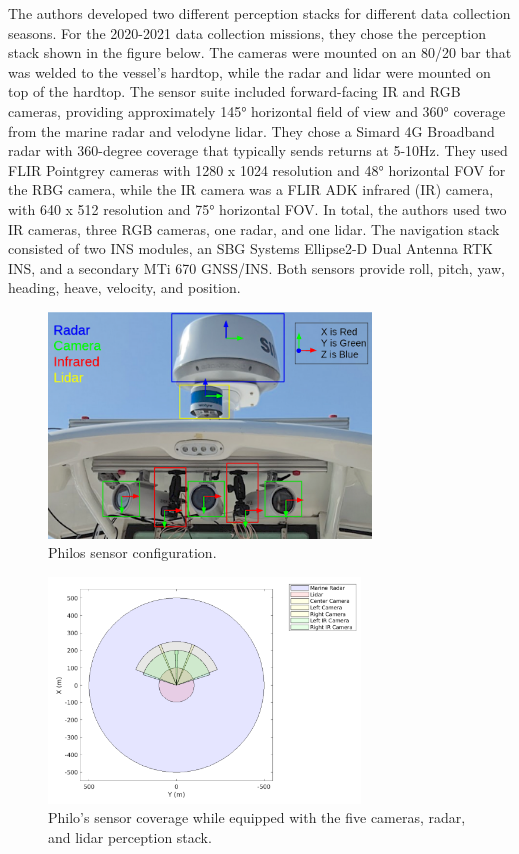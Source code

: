 The authors developed two different perception stacks for different data collection seasons. For the 2020-2021 data collection missions, they chose the perception stack shown in the figure below. The cameras were mounted on an 80/20 bar that was welded to the vessel's hardtop, while the radar and lidar were mounted on top of the hardtop. The sensor suite included forward-facing IR and RGB cameras, providing approximately 145° horizontal field of view and 360° coverage from the marine radar and velodyne lidar. They chose a Simard 4G Broadband radar with 360-degree coverage that typically sends returns at 5-10Hz. They used FLIR Pointgrey cameras with 1280 x 1024 resolution and 48° horizontal FOV for the RBG camera, while the IR camera was a FLIR ADK infrared (IR) camera, with 640 x 512 resolution and 75° horizontal FOV. In total, the authors used two IR cameras, three RGB cameras, one radar, and one lidar. The navigation stack consisted of two INS modules, an SBG Systems Ellipse2-D Dual Antenna RTK INS, and a secondary MTi 670 GNSS/INS. Both sensors provide roll, pitch, yaw, heading, heave, velocity, and position\cite{benjamin2009overview}.
\begin{figure}[H]
    \centering
    \includegraphics[width=\textwidth,height=6cm,keepaspectratio=true]{src/Images/philos_sensors.png}
    \caption{
     Philos sensor configuration\cite{defilippo2021robowhaler}.
     }
\end{figure}

\begin{figure}[H]
    \centering
    \includegraphics[width=\textwidth,height=6cm,keepaspectratio=true]{src/Images/philos_coverage.PNG}
    \caption{
     Philo's sensor coverage while equipped with the five cameras, radar, and lidar perception stack.  \cite{defilippo2021robowhaler}
     }
\end{figure}
\\

